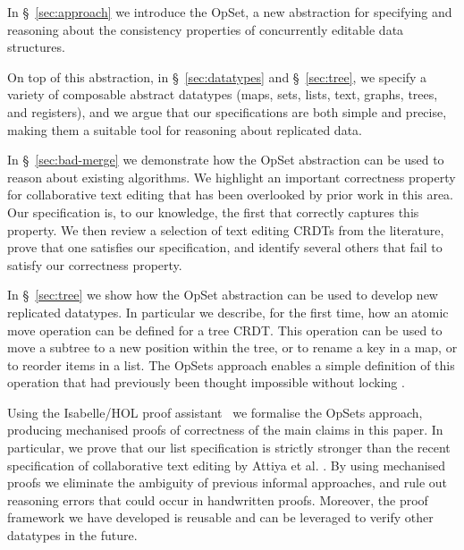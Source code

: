 \documentclass[a4paper,english]{lipics-v2018}
\begin{document}
\begin{itemize*}
\item In \S~\ref{sec:approach} we introduce the OpSet, a new abstraction for specifying and reasoning about the consistency properties of concurrently editable data structures.

\item On top of this abstraction, in \S~\ref{sec:datatypes} and \S~\ref{sec:tree}, we specify a variety of composable abstract datatypes (maps, sets, lists, text, graphs, trees, and registers), and we argue that our specifications are both simple and precise, making them a suitable tool for reasoning about replicated data.

\item In \S~\ref{sec:bad-merge} we demonstrate how the OpSet abstraction can be used to reason about existing algorithms. We highlight an important correctness property for collaborative text editing that has been overlooked by prior work in this area.
Our specification is, to our knowledge, the first that correctly captures this property.
We then review a selection of text editing CRDTs from the literature, prove that one satisfies our specification, and identify several others that fail to satisfy our correctness property.

\item In \S~\ref{sec:tree} we show how the OpSet abstraction can be used to develop new replicated datatypes. In particular we describe, for the first time, how an atomic move operation can be defined for a tree CRDT.
This operation can be used to move a subtree to a new position within the tree, or to rename a key in a map, or to reorder items in a list.
The OpSets approach enables a simple definition of this operation that had previously been thought impossible without locking \cite{Najafzadeh:2017vk}.

\item Using the Isabelle/HOL proof assistant~\cite{DBLP:conf/tphol/WenzelPN08} we formalise the OpSets approach, producing mechanised proofs of correctness of the main claims in this paper.
In particular, we prove that our list specification is strictly stronger than the recent specification of collaborative text editing by Attiya et al. \cite{Attiya:2016kh}.
By using mechanised proofs we eliminate the ambiguity of previous informal approaches, and rule out reasoning errors that could occur in handwritten proofs.
Moreover, the proof framework we have developed is reusable and can be leveraged to verify other datatypes in the future.
\end{itemize*}
\end{document}

